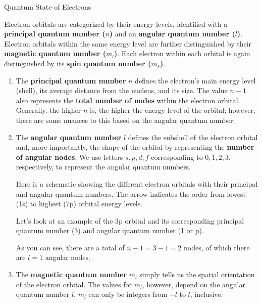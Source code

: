 \documentclass[10pt]{article}
\begin{document}
    \begin{core}[label=core:qnumbers]{Quantum State of Electrons}

      Electron orbitals are categorized by their energy levels, identified with a \textbf{principal quantum number ($n$)} and an \textbf{angular quantum number ($l$)}. Electron orbitals within the same energy level are further distinguished by their \textbf{magnetic quantum number ($m_l$)}. Each electron within each orbital is again distinguished by its \textbf{spin quantum number ($m_s$)}.

      \begin{enumerate}

        \item The \textbf{principal quantum number} $n$ defines the electron's main energy level (shell), its average distance from the nucleus, and its size. The value $n - 1$ also represents the \textbf{total number of nodes} within the electron orbital. Generally, the higher $n$ is, the higher the energy level of the orbital; however, there are some nuances to this based on the angular quantum number.

        \item The \textbf{angular quantum number} $l$ defines the subshell of the electron orbital and, more importantly, the shape of the orbital by representing the \textbf{number of angular nodes}. We use letters $s, p, d, f$ corresponding to $0, 1, 2, 3$, respectively, to represent the angular quantum numbers.

        Here is a schematic showing the different electron orbitals with their principal and angular quantum numbers. The arrow indicates the order from lowest (1s) to highest (7p) orbital energy levels. 


        Let's look at an example of the 3p orbital and its corresponding principal quantum number (3) and angular quantum number (1 or p).


        As you can see, there are a total of $n-1 = 3-1 = 2$ nodes, of which there are $l = 1$ angular nodes.

        \item The \textbf{magnetic quantum number} $m_l$ simply tells us the spatial orientation of the electron orbital. The values for $m_l$, however, depend on the angular quantum number $l$. $m_l$ can only be integers from $-l$ to $l$, inclusive.


\end{enumerate}
\end{core}
\end{document}
